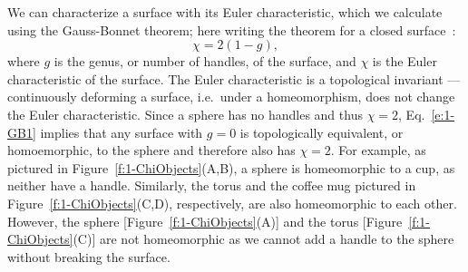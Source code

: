We can characterize a surface with its Euler characteristic, which we calculate using the Gauss-Bonnet theorem; here writing the theorem for a closed surface~\cite{RN23}:
\begin{equation}
  \chi = 2(1-g),\label{e:1-GB1}
\end{equation}
where $g$ is the genus, or number of handles, of the surface, and $\chi$ is the Euler characteristic of the surface.
The Euler characteristic is a topological invariant --- continuously deforming a surface, i.e.\ under a homeomorphism, does not change the Euler characteristic.
Since a sphere has no handles and thus $\chi=2$, Eq.~\ref{e:1-GB1} implies that any surface with $g=0$ is topologically equivalent, or homoemorphic, to the sphere and therefore also has $\chi=2$.
For example, as pictured in Figure~\ref{f:1-ChiObjects}(A,B), a sphere is homeomorphic to a cup, as neither have a handle.
Similarly, the torus and the coffee mug pictured in Figure~\ref{f:1-ChiObjects}(C,D), respectively, are also homeomorphic to each other.
However, the sphere [Figure~\ref{f:1-ChiObjects}(A)] and the torus [Figure~\ref{f:1-ChiObjects}(C)] are not homeomorphic as we cannot add a handle to the sphere without breaking the surface.

